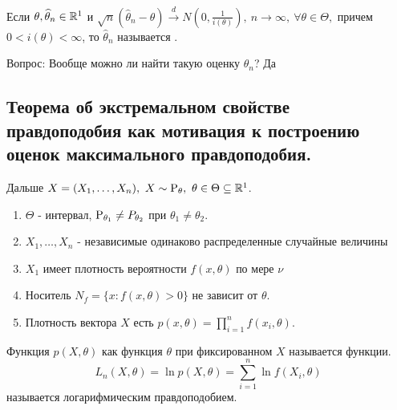 \begin{definition}
    Если \(\theta, \widehat{\theta}_n \in \R^1\) и $\sqrt{n}(\widehat{\theta}_n - \theta)\xrightarrow{d} N(0, \frac{1}{i(\theta)}),
    \ n \rightarrow \infty, \ \forall \theta \in \Theta,$
    причем \(0 < i(\theta) < \infty\), то \(\widehat{\theta}_n\) называется .
\end{definition}
Вопрос: Вообще можно ли найти такую оценку \(\widehat{\theta}_n\)? Да

\subsection{Теорема об экстремальном свойстве правдоподобия как мотивация
к построению оценок максимального правдоподобия.}

Дальше \(X = (X_1, \ldots, X_n), \ X \sim \P_\theta,\ \theta \in \Theta \subseteq \R^1\).
\begin{definition}
    \begin{enumerate}
        \item \(\Theta\) - интервал, \(\P_{\theta_1} \neq P_{\theta_2}\) при \(\theta_1 \neq \theta_2\).
        \item \(X_1, \ldots, X_n\) - независимые одинаково распределенные случайные величины
        \item \(X_1\) имеет плотность вероятности \(f(x, \theta)\) по мере \(\nu\)
        \item Носитель \(N_f = \{x: f(x, \theta) > 0\}\) не зависит от \(\theta\).
        \item Плотность вектора \(X\) есть \(p(x, \theta) = \prod_{i=1}^n f(x_i, \theta)\).
    \end{enumerate}
\end{definition}

\begin{definition}
    Функция \(p(X, \theta)\) как функция \(\theta\) при фиксированном \(X\) называется
     функции.
    \[L_n(X, \theta) = \ln p(X, \theta) = \sum_{i=1}^n \ln f(X_i, \theta)\]
    называется логарифмическим правдоподобием.
\end{definition}

